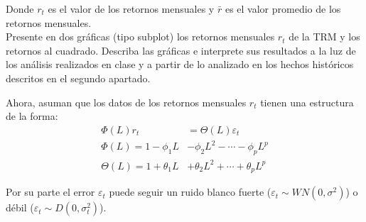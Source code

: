 \documentclass{article}
\theoremstyle{remark}
\theoremstyle{definition}
\begin{document}
\begin{enumerate}[label = \emph{\alph*})]
    {Donde $r_t$ es el valor de los retornos mensuales y $\bar{r}$ es el valor promedio de los retornos mensuales.} \\
    
    {Presente en dos gr\'aficas (tipo subplot) los retornos mensuales $r_t$ de la TRM y los retornos al cuadrado. Describa las gr\'aficas e interprete sus resultados a la luz de los an\'alisis realizados en clase y a partir de lo analizado en los hechos hist\'oricos descritos en el segundo apartado.}
        \begin{tcolorbox}[title=Soluci\'on 2.c]
            
        \end{tcolorbox}
\end{enumerate}

{Ahora, asuman que los datos de los retornos mensuales $r_t$ tienen una estructura de la forma:}
\begin{align*}
    \Phi(L)r_t &= \Theta(L)\varepsilon_t \\
    \Phi(L) = 1 − \phi_1L &− \phi_2L^2 − \cdots − \phi_pL^p \\
    \Theta(L) = 1 + \theta_1L &+ \theta_2L^2 + \cdots + \theta_pL^p
\end{align*}

{Por su parte el error $\varepsilon_t$ puede seguir un ruido blanco fuerte ($\varepsilon_t\sim WN(0,
\sigma^2)$) o d\'ebil ($\varepsilon_t\sim D(0,\sigma_t^2)$).}
\end{document}
